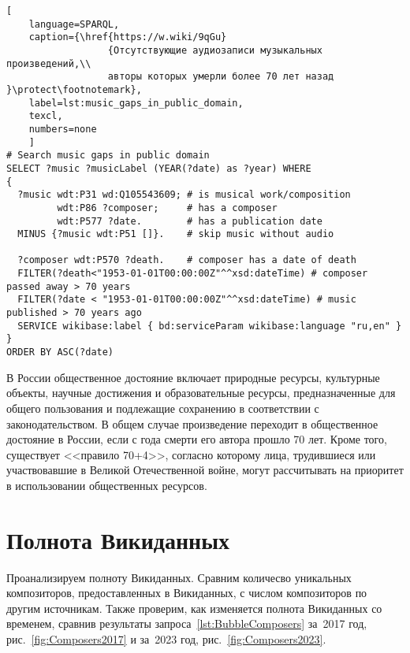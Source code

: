 \begin{lstlisting}[ 
    language=SPARQL,
    caption={\href{https://w.wiki/9qGu}
                  {Отсутствующие аудиозаписи музыкальных произведений,\\
                  авторы которых умерли более 70 лет назад }\protect\footnotemark},
    label=lst:music_gaps_in_public_domain,
    texcl,
    numbers=none
    ]
# Search music gaps in public domain
SELECT ?music ?musicLabel (YEAR(?date) as ?year) WHERE 
{
  ?music wdt:P31 wd:Q105543609; # is musical work/composition
         wdt:P86 ?composer;     # has a composer
         wdt:P577 ?date.        # has a publication date
  MINUS {?music wdt:P51 []}.	# skip music without audio 
  
  ?composer wdt:P570 ?death.    # composer has a date of death
  FILTER(?death<"1953-01-01T00:00:00Z"^^xsd:dateTime) # composer passed away > 70 years
  FILTER(?date < "1953-01-01T00:00:00Z"^^xsd:dateTime) # music published > 70 years ago
  SERVICE wikibase:label { bd:serviceParam wikibase:language "ru,en" }
}
ORDER BY ASC(?date)
\end{lstlisting}%

В России общественное достояние включает природные ресурсы, культурные объекты, 
научные достижения и образовательные ресурсы, 
предназначенные для общего пользования и подлежащие сохранению в соответствии с законодательством. 
В общем случае произведение переходит в общественное достояние в России, 
если с года смерти его автора прошло 70 лет. 
Кроме того, существует <<правило 70+4>>, согласно которому лица, 
трудившиеся или участвовавшие в Великой Отечественной войне, 
могут рассчитывать на приоритет в использовании общественных ресурсов.            



\section{Полнота Викиданных}

Проанализируем полноту Викиданных. 
Сравним количесво уникальных композиторов, предоставленных в Викиданных, 
с числом композиторов по другим источникам. 
Также проверим, как изменяется полнота Викиданных со временем, 
сравнив результаты запроса~\ref{lst:BubbleComposers} за~2017 год, 
рис.~\ref{fig:Composers2017} и за~2023 год, рис.~\ref{fig:Composers2023}.

